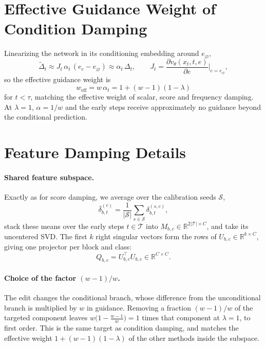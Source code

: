 \documentclass[sigconf,nonacm]{acmart}
\newcommand{\Dt}{\Delta_t}
\begin{document}
\section{Effective Guidance Weight of Condition Damping}
\label{app:cond}

Linearizing the network in its conditioning embedding around $e_\varnothing$,
\begin{equation}
  \tilde{\Delta}_t \approx J_t\,\alpha_t\,(e_c - e_\varnothing) \approx \alpha_t\,\Dt,
  \qquad
  J_t = \frac{\partial v_\theta(x_t, t, e)}{\partial e}\bigg|_{e = e_\varnothing},
  \label{eq:linearize}
\end{equation}
so the effective guidance weight is
\begin{equation}
  w_{\text{eff}} = w\,\alpha_t = 1 + (w-1)(1-\lambda)
  \label{eq:cond-weff}
\end{equation}
for $t < \tau$, matching the effective weight of scalar, score and frequency damping. At $\lambda = 1$, $\alpha = 1/w$ and the early steps receive approximately no guidance beyond the conditional prediction.

\section{Feature Damping Details}
\label{app:feat}

\paragraph{Shared feature subspace.}
Exactly as for score damping, we average over the calibration seeds $\mathcal{S}$,
\begin{equation}
  \bar{\delta}_{b,t}^{(c)} = \frac{1}{|\mathcal{S}|} \sum_{s \in \mathcal{S}} \delta_{b,t}^{(s,c)} ,
  \label{eq:feat-mean}
\end{equation}
stack these means over the early steps $t \in \mathcal{T}$ into $M_{b,c} \in \mathbb{R}^{2|\mathcal{T}| \times C}$, and take its uncentered SVD. The first $k$ right singular vectors form the rows of $U_{b,c} \in \mathbb{R}^{k \times C}$, giving one projector per block and class:
\begin{equation}
  Q_{b,c} = U_{b,c}^{\top} U_{b,c} \in \mathbb{R}^{C \times C} .
  \label{eq:feat-proj}
\end{equation}

\paragraph{Choice of the factor $(w-1)/w$.}
The edit changes the conditional branch, whose difference from the unconditional branch is multiplied by $w$ in guidance. Removing a fraction $(w-1)/w$ of the targeted component leaves $w\big(1 - \tfrac{w-1}{w}\big) = 1$ times that component at $\lambda = 1$, to first order. This is the same target as condition damping, and matches the effective weight $1 + (w-1)(1-\lambda)$ of the other methods inside the subspace.
\end{document}
